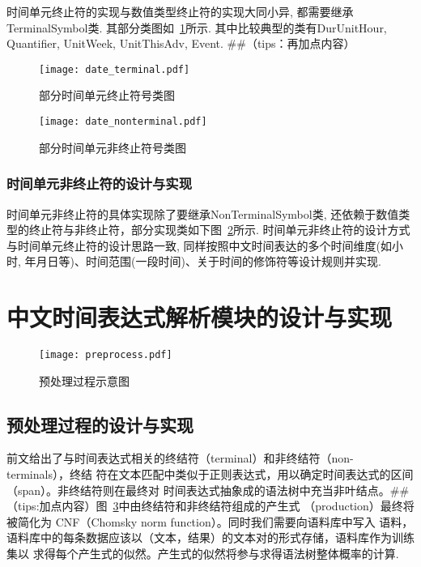 时间单元终止符的实现与数值类型终止符的实现大同小异, 都需要继承TerminalSymbol类.  其部分类图如~\ref{fig:date_terminal}所示.
其中比较典型的类有DurUnitHour, Quantifier, UnitWeek, UnitThisAdv, Event.
##（tips：再加点内容）


\begin{figure}[h]
    \centering
    \texttt{[image: date\_terminal.pdf]}
    \caption{部分时间单元终止符号类图}
    \label{fig:date_terminal}
\end{figure}

\begin{figure}[h]
    \centering
    \texttt{[image: date\_nonterminal.pdf]}
    \caption{部分时间单元非终止符号类图}
    \label{fig:date_nonterminal}
\end{figure}


\subsubsection{时间单元非终止符的设计与实现}


时间单元非终止符的具体实现除了要继承NonTerminalSymbol类, 还依赖于数值类型的终止符与非终止符，部分实现类如下图~\ref{fig:date_nonterminal}所示.
时间单元非终止符的设计方式与时间单元终止符的设计思路一致, 同样按照中文时间表达的多个时间维度(如小时, 年月日等)、时间范围(一段时间)、关于时间的修饰符等设计规则并实现.


\section{中文时间表达式解析模块的设计与实现}

\begin{figure}[h]
    \centering
    \texttt{[image: preprocess.pdf]}
    \caption{预处理过程示意图}
    \label{fig:preprocess}
\end{figure}


\subsection{预处理过程的设计与实现}

前文给出了与时间表达式相关的终结符（terminal）和非终结符（non-terminals），终结
符在文本匹配中类似于正则表达式，用以确定时间表达式的区间（span）。非终结符则在最终对
时间表达式抽象成的语法树中充当非叶结点。##（tips:加点内容）图~\ref{fig:preprocess}中由终结符和非终结符组成的产生式
（production）最终将被简化为 CNF（Chomsky norm function）。同时我们需要向语料库中写入
语料，语料库中的每条数据应该以（文本，结果）的文本对的形式存储，语料库作为训练集以
求得每个产生式的似然。产生式的似然将参与求得语法树整体概率的计算.

